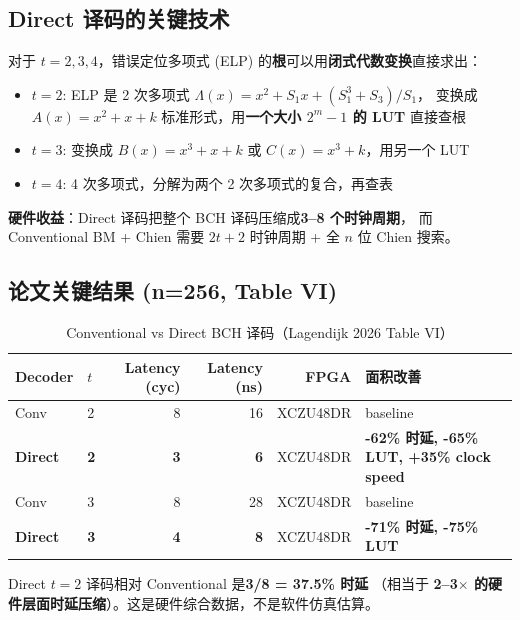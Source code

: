 \documentclass[11pt,a4paper]{article}
\begin{document}
\subsection{Direct 译码的关键技术}

对于 $t = 2, 3, 4$，错误定位多项式 (ELP) 的\textbf{根}可以用\textbf{闭式代数变换}直接求出：

\begin{itemize}[leftmargin=1.5em, itemsep=1pt]
\item $t = 2$: ELP 是 2 次多项式 $\Lambda(x) = x^2 + S_1 x + (S_1^3 + S_3)/S_1$，
  变换成 $A(x) = x^2 + x + k$ 标准形式，用\textbf{一个大小 $2^m - 1$ 的 LUT} 直接查根
\item $t = 3$: 变换成 $B(x) = x^3 + x + k$ 或 $C(x) = x^3 + k$，用另一个 LUT
\item $t = 4$: 4 次多项式，分解为两个 2 次多项式的复合，再查表
\end{itemize}

\textbf{硬件收益}：Direct 译码把整个 BCH 译码压缩成\textbf{3--8 个时钟周期}，
而 Conventional BM + Chien 需要 $2t + 2$ 时钟周期 + 全 $n$ 位 Chien 搜索。

\subsection{论文关键结果 (n=256, Table VI)}

\begin{table}[!ht]
\centering
\begin{tabularx}{\textwidth}{llrrrl}
\toprule
Decoder & $t$ & Latency (cyc) & Latency (ns) & FPGA & 面积改善 \\
\midrule
Conv     & 2   & 8             & 16           & XCZU48DR & baseline \\
\textbf{Direct}   & \textbf{2}   & \textbf{3}    & \textbf{6}   & XCZU48DR & \textbf{-62\% 时延, -65\% LUT, +35\% clock speed} \\
Conv     & 3   & 8             & 28           & XCZU48DR & baseline \\
\textbf{Direct}   & \textbf{3}   & \textbf{4}    & \textbf{8}   & XCZU48DR & \textbf{-71\% 时延, -75\% LUT} \\
\bottomrule
\end{tabularx}
\caption{Conventional vs Direct BCH 译码（Lagendijk 2026 Table VI）}
\end{table}

\begin{keybox}[title=\textbf{核心观察}]
Direct $t=2$ 译码相对 Conventional 是\textbf{3/8 = 37.5\% 时延}
（相当于 \textbf{2--3$\times$ 的硬件层面时延压缩}）。这是硬件综合数据，不是软件仿真估算。
\end{keybox}
\end{document}
